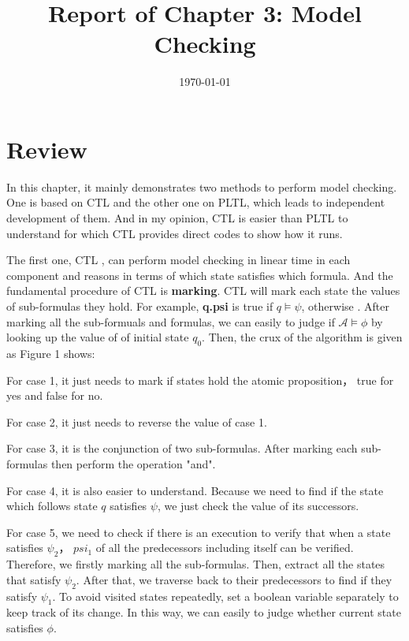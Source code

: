 \documentclass[11pt, conference]{IEEEtran}
\begin{document}
    \title{Report of Chapter 3: Model Checking}
    \author{}
    \date{\today}
    \maketitle

    \section{Review}
    In this chapter, it mainly demonstrates two methods to perform model checking. One is based on CTL and the other one on PLTL, which leads to independent development of them. And in my opinion, CTL is easier than PLTL to understand for which CTL provides direct codes to show how it runs. 
    
    The first one, CTL , can perform model checking in linear time in each component and reasons in terms of which state satisfies which formula. And the fundamental procedure of CTL is \textbf{marking}. CTL will mark each state the values of sub-formulas they hold. For example, \textbf{q.psi} is true if $q\models\psi$, otherwise . After marking all the sub-formuals and formulas, we can easily to judge if $\mathcal{A}\models\phi$ by looking up the value of  of initial state $q_0$. Then, the crux of the algorithm is given as Figure 1 shows:
    

    For case 1, it just needs to mark if states hold the atomic proposition， true for yes and false for no.
    
    For case 2, it just needs to reverse the value of case 1.
    
    For case 3, it is the conjunction of two sub-formulas. After marking each sub-formulas then perform the operation "and".
    
    For case 4, it is also easier to understand. Because we need to find if the state which follows state $q$ satisfies $\psi$, we just check the value of its successors.
    
    For case 5, we need to check if there is an execution to verify that when a state satisfies $\psi_2$， $psi_1$ of all the predecessors including itself can be verified. Therefore, we firstly marking all the sub-formulas. Then, extract all the states that satisfy $\psi_2$. After that, we traverse back to their predecessors to find if they satisfy $\psi_1$. To avoid visited states repeatedly, set a boolean variable separately to keep track of its change. In this way, we can easily to judge whether current state satisfies $\phi$. 
\end{document}
